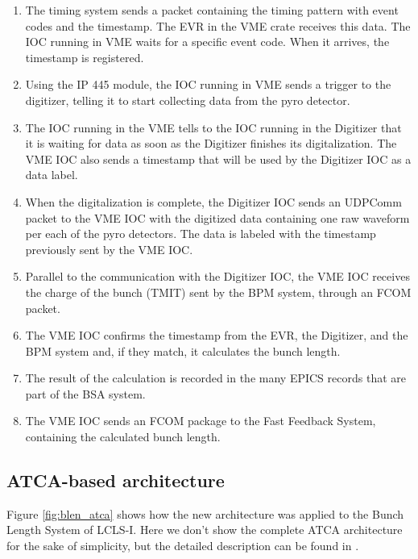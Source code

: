 \documentclass[letter,
        biblatex,   %
        keeplastbox,  %
        ]{jacow}
\begin{document}
\begin{enumerate}
  \item The timing system sends a packet containing the timing pattern with event codes and the timestamp. The EVR in the VME crate receives this data. The IOC running in VME waits for a specific event code. When it arrives, the timestamp is registered.
  \item Using the IP 445 module, the IOC running in VME sends a trigger to the digitizer, telling it to start collecting data from the pyro detector.
  \item The IOC running in the VME tells to the IOC running in the Digitizer that it is waiting for data as soon as the Digitizer finishes its digitalization. The VME IOC also sends a timestamp that will be used by the Digitizer IOC as a data label.
  \item When the digitalization is complete, the Digitizer IOC sends an UDPComm packet to the VME IOC with the digitized data containing one raw waveform per each of the pyro detectors. The data is labeled with the timestamp previously sent by the VME IOC. 
  \item Parallel to the communication with the Digitizer IOC, the VME IOC receives the charge of the bunch (TMIT) sent by the BPM system, through an FCOM packet.
  \item The VME IOC confirms the timestamp from the EVR, the Digitizer, and the BPM system and, if they match, it calculates the bunch length.
  \item The result of the calculation is recorded in the many EPICS records that are part of the BSA system.
  \item The VME IOC sends an FCOM package to the Fast Feedback System, containing the calculated bunch length.
\end{enumerate}

\subsection{ATCA-based architecture}
Figure \ref{fig:blen_atca} shows how the new architecture was applied to the Bunch Length System of LCLS-I. Here we don't show the complete ATCA architecture for the sake of simplicity, but the detailed description can be found in \cite{ryan-2016, atca-bpm-2017}.
\end{document}
